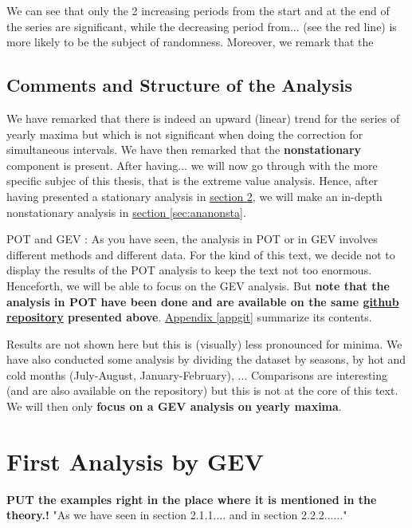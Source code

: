 \documentclass[11pt,a4paper,openany ]{book}
\begin{document}
We can see that only the 2 increasing periods from the start and at the end of the series are significant, while the decreasing period from... (see the red line) is more likely to be the subject of randomness. Moreover, we remark that the 


\section{Comments and Structure of the Analysis }

 We have remarked that there is indeed an upward (linear) trend for the series of yearly maxima but which is not significant when doing the correction for simultaneous intervals.
We have then remarked that the \textbf{nonstationary} component is present. After having... we will now go through with the more specific subjec of this thesis, that is the extreme value analysis. Hence, after having presented a stationary analysis in \hyperref[sec:anagev]{section \ref{sec:anagev}}, we will make an in-depth nonstationary analysis in \hyperref[sec:ananonsta]{section \ref{sec:ananonsta}}.


POT and GEV : 
As you have seen, the analysis in POT or in GEV involves different methods and different data. For the kind of this text, we decide not to display the results of the POT analysis to keep the text not too enormous. Henceforth, we will be able to focus on the GEV analysis. But\textbf{ note that the analysis in POT have been done and are available on the same \hyperref[xxx]{github repository} presented above}.
\hyperref[appgit]{Appendix \ref{appgit}} summarize its contents.


Results are not shown here but this is (visually) less pronounced for minima. We have also conducted some analysis by dividing the dataset by seasons, by hot and cold months (July-August, January-February), ... 
Comparisons are interesting (and are also available on the repository) but this is not at the core of this text. 
We will then only \textbf{focus on a GEV analysis on yearly maxima}.

\chapter{First Analysis by GEV }\label{sec:anagev}
\minitoc \thispagestyle{empty}


\textbf{PUT the examples right in the place where it is mentioned in the theory.!} 
"As we have seen in section 2.1.1.... and in section 2.2.2......"
\end{document}
